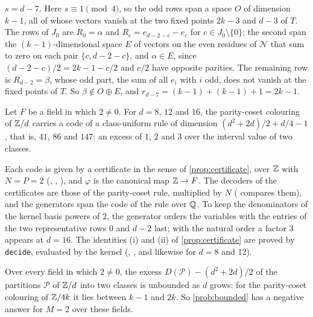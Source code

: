 \begin{informalproof}
\emph{$s=d-7$.} Here $s\equiv1\pmod4$, so the odd rows span a space $O$ of dimension $k-1$, all of whose vectors vanish at
the two fixed points $2k-3$ and $d-3$ of $T$. The rows of $J_0$ are $R_0=\alpha$ and $R_c=e_{d-2-c}-e_c$ for
$c\in J_0\setminus\{0\}$; the second span the $(k-1)$-dimensional space $E$ of vectors on the even residues of $\mathcal N$ that sum to zero on each
pair $\{c,d-2-c\}$, and $\alpha\in E$, since $(d-2-c)/2=2k-1-c/2$ and $c/2$ have opposite parities. The remaining row
is $R_{d-2}=\beta$, whose odd part, the sum of all $e_i$ with $i$ odd, does not vanish at the fixed points of $T$. So
$\beta\notin O\oplus E$, and $r_{d-7}=(k-1)+(k-1)+1=2k-1$.
\end{informalproof}

\begin{theorem}[The cases $d=8$, $12$ and $16$ in Lean]\label{thm:parity}
Let $F$ be a field in which $2\ne0$. For $d=8$, $12$ and $16$, the parity-coset colouring of $\mathbb{Z}/d$ carries a code of a
class-uniform rule of dimension $(d^2+2d)/2+d/4-1$, that is, $41$, $86$ and $147$: an excess of $1$, $2$ and $3$ over
the interval value of two classes.
\end{theorem}

\begin{outline}
Each code is given by a certificate in the sense of \cref{prop:certificate}, over $\mathbb{Z}$ with $N=P=2$ (,
, ), and $\varphi$ is the canonical map $\mathbb{Z}\to F$. The decoders of the
certificates are those of the parity-coset rule, multiplied by $N$ ( compares them),
and the generators span the code of the rule over $\mathbb{Q}$. To keep the denominators of the kernel basis powers of $2$, the
generator  orders the variables with the entries of the two representative
rows $0$ and $d-2$ last; with the natural order a factor $3$ appears at $d=16$. The identities (i) and (ii) of
\cref{prop:certificate} are proved by \texttt{decide}, evaluated by the kernel (,
, and likewise for $d=8$ and $12$).
\end{outline}

\begin{corollary}\label{cor:unbounded}
\par{}\par
\smallskip\noindent\ignorespaces
Over every field in which $2\ne0$, the excess $D(\mathcal P)-(d^2+2d)/2$ of the partitions $\mathcal P$ of $\mathbb{Z}/d$ into
two classes is unbounded as $d$ grows: for the parity-coset colouring of $\mathbb{Z}/4k$ it lies between $k-1$ and $2k$. So
\cref{prob:bounded} has a negative answer for $M=2$ over these fields.
\end{corollary}

